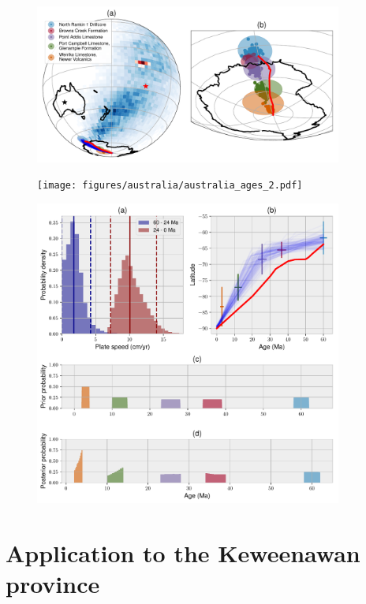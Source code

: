 \documentclass[preprint,12pt,authoryear]{elsarticle}
\begin{document}
\begin{figure}
\includegraphics[width=0.9\textwidth]{figures/australia/australia_paths_2.pdf}
\caption{}
\label{fig:australia_paths_2}
\end{figure}
\begin{figure}
\texttt{[image: figures/australia/australia\_ages\_2.pdf]}
\caption{}
\label{fig:australia_ages_2}
\end{figure}
\begin{figure}
\includegraphics[width=0.9\textwidth]{figures/australia/australia_speeds_2.pdf}
\caption{}
\label{fig:australia_speeds_2}
\end{figure}


\section{Application to the Keweenawan province}
\label{sec:keweenawan}
\end{document}
